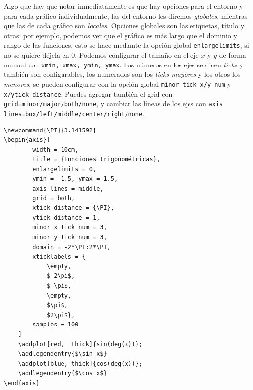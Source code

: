 \documentclass[intro-breve-latex.tex]{subfiles}
\begin{document}
Algo que hay que notar inmediatamente es que hay opciones para el entorno y para cada gráfico individualmente, las del entorno les diremos \textit{globales}, mientras que las de cada gráfico son \textit{locales}. Opciones globales son las etiquetas, título y otras: por ejemplo, podemos ver que el gráfico es más largo que el dominio y rango de las funciones, esto se hace mediante la opción global \texttt{enlargelimits}, si no se quiere déjela en 0. Podemos configurar el tamaño en el eje $x$ y $y$ de forma manual con \texttt{xmin, xmax, ymin, ymax}. Los números en los ejes se dicen \textit{ticks} y también son configurables, los numerados son los \textit{ticks mayores} y los otros los \textit{menores}; se pueden configurar con la opción global \texttt{minor tick x/y num} y \texttt{x/ytick distance}. Puedes agregar también el grid con \texttt{grid=minor/major/both/none}, y cambiar las líneas de los ejes con \texttt{axis lines=box/left/middle/center/right/none}.
\begin{lstlisting}[basicstyle=\footnotesize\ttfamily]
\newcommand{\PI}{3.141592}
\begin{axis}[
		width = 10cm,
		title = {Funciones trigonométricas},
		enlargelimits = 0,
		ymin = -1.5, ymax = 1.5,
		axis lines = middle,
		grid = both,
		xtick distance = {\PI},
		ytick distance = 1,
		minor x tick num = 3,
		minor y tick num = 3,
		domain = -2*\PI:2*\PI,
		xticklabels = {
			\empty,
			$-2\pi$,
			$-\pi$,
			\empty,
			$\pi$,
			$2\pi$},
		samples = 100
	]
	\addplot[red,  thick]{sin(deg(x))};
	\addlegendentry{$\sin x$}
	\addplot[blue, thick]{cos(deg(x))};
	\addlegendentry{$\cos x$}
\end{axis}
\end{lstlisting}
\begin{figure}[!h]
	\centering
\end{figure}
\end{document}
